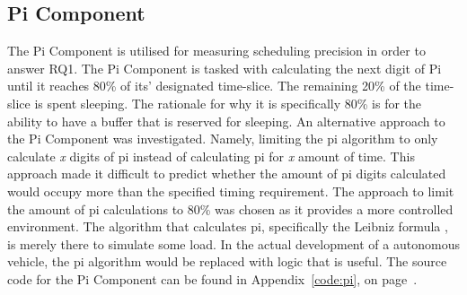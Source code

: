 
\subsection{Pi Component}
The Pi Component is utilised for measuring scheduling precision in order to answer RQ1. The Pi Component is tasked with calculating the next digit of Pi until it reaches 80\% of its' designated time-slice. The remaining 20\% of the time-slice is spent sleeping. The rationale for why it is specifically 80\% is for the ability to have a buffer that is reserved for sleeping. An alternative approach to the Pi Component was investigated. Namely, limiting the pi algorithm to only calculate \textit{x} digits of pi instead of calculating pi for \textit{x} amount of time. This approach made it difficult to predict whether the amount of pi digits calculated would occupy more than the specified timing requirement. The approach to limit the amount of pi calculations to 80\% was chosen as it provides a more controlled environment. The algorithm that calculates pi, specifically the Leibniz formula \cite{leibniz}, is merely there to simulate some load. In the actual development of a autonomous vehicle, the pi algorithm would be replaced with logic that is useful. The source code for the Pi Component can be found in Appendix~\ref{code:pi}, on page~\pageref{code:pi}.  





